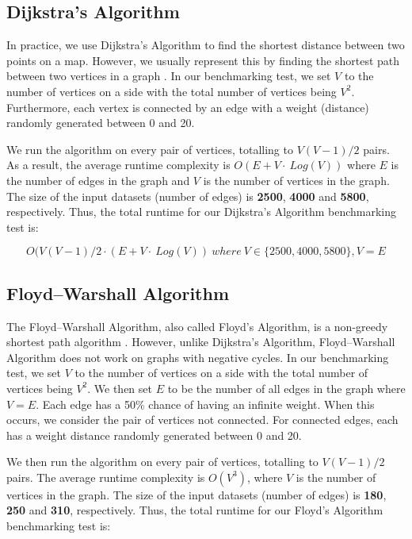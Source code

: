 \bigskip
\subsection{Dijkstra's Algorithm}

In practice, we use Dijkstra's Algorithm to find the shortest distance between two points on a map. However, we usually represent this by finding the shortest path between two vertices in a graph \cite{exp58}. In our benchmarking test, we set \(V\) to the number of vertices on a side with the total number of vertices being \(V^2\). Furthermore, each vertex is connected by an edge with a weight (distance) randomly generated between 0 and 20.

We run the algorithm on every pair of vertices, totalling to \(V(V-1)/2\) pairs. As a result, the average runtime complexity is \(O(E+V\cdot\ Log(V))\) where \(E\) is the number of edges in the graph and \(V\) is the number of vertices in the graph. The size of the input datasets (number of edges) is \textbf{2500}, \textbf{4000} and \textbf{5800}, respectively. Thus, the total runtime for our Dijkstra's Algorithm benchmarking test is:

\[ O(V(V-1)/2 \cdot (E+V\cdot\ Log(V))\ where\ V \in \{2500, 4000, 5800\}, V = E \]

\bigskip
\subsection{Floyd–Warshall Algorithm}

The Floyd–Warshall Algorithm, also called Floyd's Algorithm, is a non-greedy shortest path algorithm \cite{exp59}. However, unlike Dijkstra's Algorithm, Floyd–Warshall Algorithm does not work on graphs with negative cycles. In our benchmarking test, we set \(V\) to the number of vertices on a side with the total number of vertices being \(V^2\). We then set \(E\) to be the number of all edges in the graph where \(V = E\). Each edge has a 50\% chance of having an infinite weight. When this occurs, we consider the pair of vertices not connected. For connected edges, each has a weight distance randomly generated between 0 and 20.

We then run the algorithm on every pair of vertices, totalling to \(V(V-1)/2\) pairs. The average runtime complexity is \(O(V^3)\), where \(V\) is the number of vertices in the graph. The size of the input datasets (number of edges) is \textbf{180}, \textbf{250} and \textbf{310}, respectively. Thus, the total runtime for our Floyd's Algorithm benchmarking test is:

